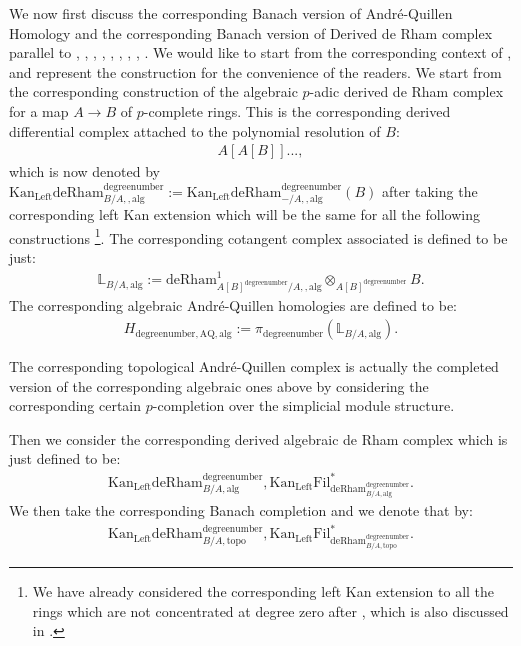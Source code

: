 \documentclass[11pt]{book}
\theoremstyle{definition}
\numberwithin{equation}{section}
\begin{document}
\indent We now first discuss the corresponding Banach version of  Andr\'e-Quillen Homology and the corresponding Banach version of  Derived de Rham complex parallel to \cite[Chapitre 3]{12An1}, \cite{12An2}, \cite[Chapter 2, Chapter 8]{12B1}, \cite[Chapter 1]{12Bei}, \cite[Chapter 5]{12G1}, \cite[Chapter 3, Chapter 4]{12GL}, \cite[Chapitre II, Chapitre III]{12Ill1}, \cite[Chapitre VIII]{12Ill2}, \cite[Section 4]{12Qui}. We would like to start from the corresponding context of \cite[Chapter 3, Chapter 4]{12GL}, and represent the construction for the convenience of the readers. We start from the corresponding construction of the algebraic $p$-adic derived de Rham complex for a map $A\rightarrow B$ of $p$-complete rings. This is the corresponding derived differential complex attached to the polynomial resolution of $B$:
\begin{align}
A[A[B]]...,	
\end{align}
which is now denoted by $\mathrm{Kan}_\mathrm{Left}\mathrm{deRham}^\text{degreenumber}_{B/A,,\mathrm{alg}}:=\mathrm{Kan}_\mathrm{Left}\mathrm{deRham}^\text{degreenumber}_{-/A,,\mathrm{alg}}(B)$ after taking the corresponding left Kan extension which will be the same for all the following constructions \footnote{We have already considered the corresponding left Kan extension to all the rings which are not concentrated at degree zero after \cite[Example 5.11, Example 5.12]{12BMS}, which is also discussed in \cite[Lecture 7]{12B2}.}. The corresponding cotangent complex associated is defined to be just:
\begin{align}
\mathbb{L}_{B/A,\mathrm{alg}}:=	\mathrm{deRham}^1_{A[B]^\text{degreenumber}/A,,\mathrm{alg}}\otimes_{A[B]^\text{degreenumber}} B.
\end{align}
The corresponding algebraic Andr\'e-Quillen homologies are defined to be:
\begin{align}
H_{\text{degreenumber},{\mathrm{AQ}},\mathrm{alg}}:=\pi_\text{degreenumber} (\mathbb{L}_{B/A,\mathrm{alg}}). 	
\end{align}

\indent The corresponding topological Andr\'e-Quillen complex is actually the completed version of the corresponding algebraic ones above by considering the corresponding certain $p$-completion over the simplicial module structure.







\indent Then we consider the corresponding derived algebraic de Rham complex which is just defined to be:
\begin{align}
\mathrm{Kan}_\mathrm{Left}\mathrm{deRham}^\text{degreenumber}_{B/A,\mathrm{alg}},\mathrm{Kan}_\mathrm{Left}\mathrm{Fil}^*_{\mathrm{deRham}^\text{degreenumber}_{B/A,\mathrm{alg}}}.	
\end{align}
We then take the corresponding Banach completion and we denote that by:
\begin{align}
\mathrm{Kan}_\mathrm{Left}\mathrm{deRham}^\text{degreenumber}_{B/A,\mathrm{topo}},\mathrm{Kan}_\mathrm{Left}\mathrm{Fil}^*_{\mathrm{deRham}^\text{degreenumber}_{B/A,\mathrm{topo}}}.	
\end{align}
\end{document}
